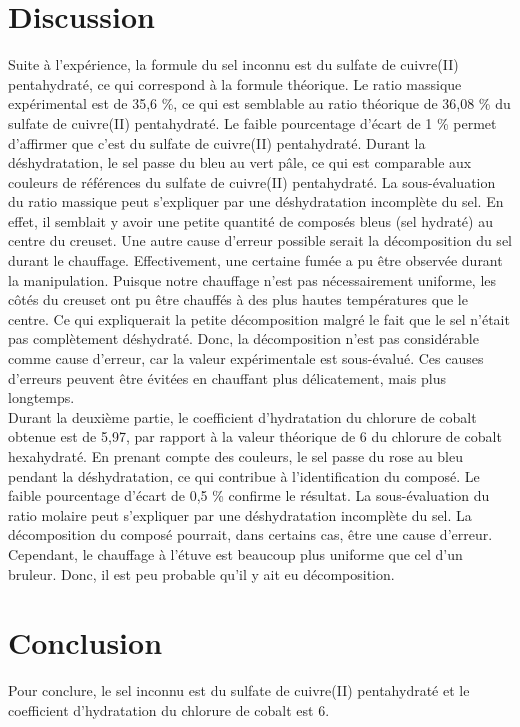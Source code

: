 \documentclass[11pt]{article}
\begin{document}
\section*{Discussion}
Suite à l'expérience, la formule du sel inconnu est du sulfate de cuivre(II) pentahydraté, ce qui correspond à la formule théorique. Le ratio massique expérimental est de 35,6 \%, ce qui est semblable au ratio théorique de 36,08 \% du sulfate de cuivre(II) pentahydraté. Le faible pourcentage d’écart de 1 \% permet d’affirmer que c’est du sulfate de cuivre(II) pentahydraté. Durant la déshydratation, le sel passe du bleu au vert pâle, ce qui est comparable aux couleurs de références du sulfate de cuivre(II) pentahydraté. La sous-évaluation du ratio massique peut s’expliquer par une déshydratation incomplète du sel. En effet, il semblait y avoir une petite quantité de composés bleus (sel hydraté) au centre du creuset. Une autre cause d’erreur possible serait la décomposition du sel durant le chauffage. Effectivement, une certaine fumée a pu être observée durant la manipulation. Puisque notre chauffage n’est pas nécessairement uniforme, les côtés du creuset ont pu être chauffés à des plus hautes températures que le centre. Ce qui expliquerait la petite décomposition malgré le fait que le sel n’était pas complètement déshydraté. Donc, la décomposition n’est pas considérable comme cause d’erreur, car la valeur expérimentale est sous-évalué. Ces causes d’erreurs peuvent être évitées en chauffant plus délicatement, mais plus longtemps.\\

Durant la deuxième partie, le coefficient d’hydratation du chlorure de cobalt obtenue est de 5,97, par rapport à la valeur théorique de 6 du chlorure de cobalt hexahydraté. En prenant compte des couleurs, le sel passe du rose au bleu pendant la déshydratation, ce qui contribue à l’identification du composé. Le faible pourcentage d’écart de 0,5 \% confirme le résultat. La sous-évaluation du ratio molaire peut s’expliquer par une déshydratation incomplète du sel. La décomposition du composé pourrait, dans certains cas, être une cause d’erreur. Cependant, le chauffage à l’étuve est beaucoup plus uniforme que cel d'un bruleur. Donc, il est peu probable qu’il y ait eu décomposition. 

\section*{Conclusion}
Pour conclure, le sel inconnu est du sulfate de cuivre(II) pentahydraté et le coefficient d’hydratation du chlorure de cobalt est 6.
\end{document}
